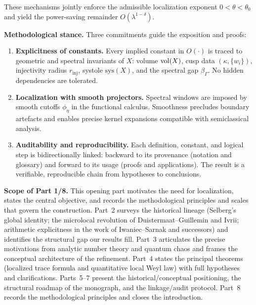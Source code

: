 These mechanisms jointly enforce the admissible localization exponent
$0<\theta<\theta_0$ and yield the power-saving remainder $O(\lambda^{1-\delta})$.

\medskip

\noindent\textbf{Methodological stance.}
Three commitments guide the exposition and proofs:

\begin{enumerate}[label=\arabic*.]
  \item \textbf{Explicitness of constants.}
  Every implied constant in $O(\cdot)$ is traced to geometric and spectral
  invariants of $X$: volume $\operatorname{vol}(X)$, cusp data $(\kappa,\{w_i\})$,
  injectivity radius $r_{\mathrm{inj}}$, systole $\mathrm{sys}(X)$, and the
  spectral gap $\beta_\Gamma$. No hidden dependencies are tolerated.

  \item \textbf{Localization with smooth projectors.}
  Spectral windows are imposed by smooth cutoffs $\phi_\eta$ in the functional
  calculus. Smoothness precludes boundary artefacts and enables precise kernel
  expansions compatible with semiclassical analysis.

  \item \textbf{Auditability and reproducibility.}
  Each definition, constant, and logical step is bidirectionally linked:
  backward to its provenance (notation and glossary) and forward to its usage
  (proofs and applications). The result is a verifiable, reproducible chain
  from hypotheses to conclusions.
\end{enumerate}

\medskip

\noindent\textbf{Scope of Part 1/8.}
This opening part motivates the need for localization, states the central objective,
and records the methodological principles and scales that govern the construction.
Part~2 surveys the historical lineage (Selberg’s global identity; the microlocal
revolution of Duistermaat–Guillemin and Ivrii; arithmetic explicitness in the work
of Iwaniec–Sarnak and successors) and identifies the structural gap our results fill.
Part~3 articulates the precise motivations from analytic number theory and quantum
chaos and frames the conceptual architecture of the refinement. Part~4 states the
principal theorems (localized trace formula and quantitative local Weyl law) with
full hypotheses and clarifications. Parts~5–7 present the historical/conceptual
positioning, the structural roadmap of the monograph, and the linkage/audit protocol.
Part~8 records the methodological principles and closes the introduction.

